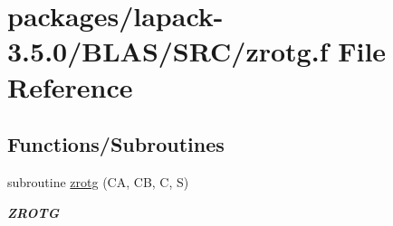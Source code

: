 \hypertarget{lapack-3_85_80_2BLAS_2SRC_2zrotg_8f}{}\section{packages/lapack-\/3.5.0/\+B\+L\+A\+S/\+S\+R\+C/zrotg.f File Reference}
\label{lapack-3_85_80_2BLAS_2SRC_2zrotg_8f}
\subsection*{Functions/\+Subroutines}
\begin{DoxyCompactItemize}
\item 
subroutine \hyperlink{group__complex16__blas__level1_gabaa4dfc937ebc2c9f2129d843a80d56e}{zrotg} (C\+A, C\+B, C, S)
\begin{DoxyCompactList}\small\item\em {\bfseries Z\+R\+O\+T\+G} \end{DoxyCompactList}\end{DoxyCompactItemize}
